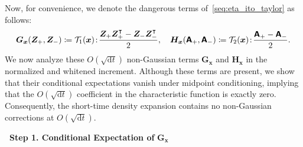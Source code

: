 
Now, for convenience, we denote the dangerous terms of~\eqref{seq:eta_ito_taylor} as follows:
\begin{equation}
    \bm{G}_{\bm{x}}(\bm{Z}_+,\bm{Z}_-)\coloneq
    \mathcal{T}_1(\bm{x})\!:\!
    \frac{\bm{Z}_+\bm{Z}_+^\intercal-\bm{Z}_-\bm{Z}_-^\intercal}{2},
    \quad
    \bm{H}_{\bm{x}}(\boldsymbol{\mathsf{A}}_+,\boldsymbol{\mathsf{A}}_-)\coloneq
    \mathcal{T}_2(\bm{x})\!:\!\frac{
    \boldsymbol{\mathsf{A}}_+-\boldsymbol{\mathsf{A}}_-}{2}.
    \label{seq:def_G_and_H}
\end{equation}
We now analyze these $O(\sqrt{\mathrm{d}t})$ non-Gaussian terms $\bm{G}_{\bm{x}}$ and $\bm{H}_{\bm{x}}$ in the normalized and whitened increment. Although these terms are present, we show that their conditional expectations vanish under midpoint conditioning, implying that the $O(\sqrt{\mathrm{d}t})$ coefficient in the characteristic function is exactly zero. Consequently, the short-time density expansion contains no non-Gaussian corrections at $O(\sqrt{\mathrm{d}t})$.

\bigskip
\noindent\textbf{\textbullet\ Step 1. Conditional Expectation of} $\bm{G}_{\bm{x}}$

